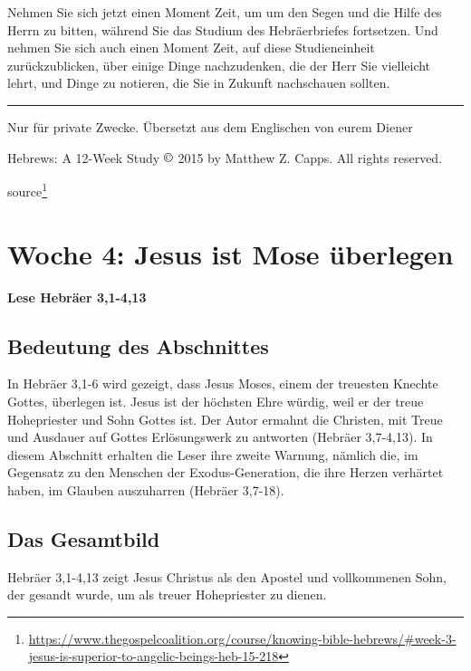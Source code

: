 \documentclass[
  12pt,
]{krantz}
\makeatletter
\newenvironment{kframe}{%
\medskip{}
\setlength{\fboxsep}{.8em}
 \def\at@end@of@kframe{}%
 \ifinner\ifhmode%
  \def\at@end@of@kframe{\end{minipage}}%
  \begin{minipage}{\columnwidth}%
 \fi\fi%
 \def\FrameCommand##1{\hskip\@totalleftmargin \hskip-\fboxsep
 \colorbox{shadecolor}{##1}\hskip-\fboxsep
     \hskip-\linewidth \hskip-\@totalleftmargin \hskip\columnwidth}%
 \MakeFramed {\advance\hsize-\width
   \@totalleftmargin\z@ \linewidth\hsize
   \@setminipage}}%
 {\par\unskip\endMakeFramed%
 \at@end@of@kframe}
\newenvironment{rmdblock}[1]
  {
  \begin{itemize}
  \renewcommand{\labelitemi}{
    \raisebox{-.7\height}[0pt][0pt]{
      {\setkeys{Gin}{width=3em,keepaspectratio}\texttt{[image: img/\#1]}}
    }
  }
  \setlength{\fboxsep}{1em}
  \begin{kframe}
  \item
  }
  {
  \end{kframe}
  \end{itemize}
  }
\newenvironment{rmdbible}
  {\begin{rmdblock}{bible}}
  {\end{rmdblock}}
\renewcommand{\href}[2]{#2\footnote{\url{#1}}}
\makeatother
\begin{document}
Nehmen Sie sich jetzt einen Moment Zeit, um um den Segen und die Hilfe des Herrn zu bitten, während Sie das Studium des Hebräerbriefes fortsetzen. Und nehmen Sie sich auch einen Moment Zeit, auf diese Studieneinheit zurückzublicken, über einige Dinge nachzudenken, die der Herr Sie vielleicht lehrt, und Dinge zu notieren, die Sie in Zukunft nachschauen sollten.

\begin{center}\rule{0.5\linewidth}{0.5pt}\end{center}

Nur für private Zwecke. Übersetzt aus dem Englischen von eurem Diener

Hebrews: A 12-Week Study \(\copyright\) 2015 by Matthew Z. Capps. All rights reserved.

\href{https://www.thegospelcoalition.org/course/knowing-bible-hebrews/\#week-3-jesus-is-superior-to-angelic-beings-heb-15-218}{source}

\hypertarget{woche04}{%
\chapter{Woche 4: Jesus ist Mose überlegen}\label{woche04}}

\begin{rmdbible}
\textbf{Lese Hebräer 3,1-4,13}
\end{rmdbible}

\hypertarget{bedeutung-des-abschnittes}{%
\section{Bedeutung des Abschnittes}\label{bedeutung-des-abschnittes}}

In Hebräer 3,1-6 wird gezeigt, dass Jesus Moses, einem der treuesten Knechte Gottes, überlegen ist. Jesus ist der höchsten Ehre würdig, weil er der treue Hohepriester und Sohn Gottes ist. Der Autor ermahnt die Christen, mit Treue und Ausdauer auf Gottes Erlösungswerk zu antworten (Hebräer 3,7-4,13). In diesem Abschnitt erhalten die Leser ihre zweite Warnung, nämlich die, im Gegensatz zu den Menschen der Exodus-Generation, die ihre Herzen verhärtet haben, im Glauben auszuharren (Hebräer 3,7-18).

\hypertarget{das-gesamtbild}{%
\section{Das Gesamtbild}\label{das-gesamtbild}}

Hebräer 3,1-4,13 zeigt Jesus Christus als den Apostel und vollkommenen Sohn, der gesandt wurde, um als treuer Hohepriester zu dienen.
\end{document}
